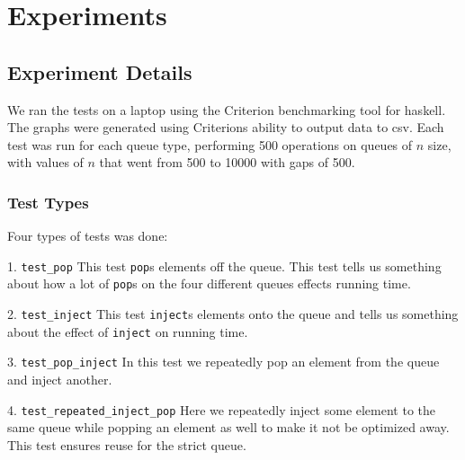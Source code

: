 \section{Experiments}
\subsection{Experiment Details}
We ran the tests on a laptop using the Criterion benchmarking tool for haskell. The graphs were generated using Criterions ability to output data to csv. Each test was run for each queue type, performing 500 operations on queues of $n$ size, with values of $n$ that went from 500 to 10000 with gaps of 500.

\subsubsection{Test Types}
Four types of tests was done:
\begin{description}
\item{1. \texttt{test\_pop}}
This test \texttt{pop}s elements off the queue. This test tells us something about how a lot of \texttt{pop}s on the four different queues effects running time.
\item{2. \texttt{test\_inject}}
This test \texttt{inject}s elements onto the queue and tells us something about the effect of \texttt{inject} on running time.
\item{3. \texttt{test\_pop\_inject}}
In this test we repeatedly pop an element from the queue and inject another.
\item{4. \texttt{test\_repeated\_inject\_pop}}
Here we repeatedly inject some element to the same queue while popping an element as well to make it not be optimized away. This test ensures reuse for the strict queue. 
\end{description}



